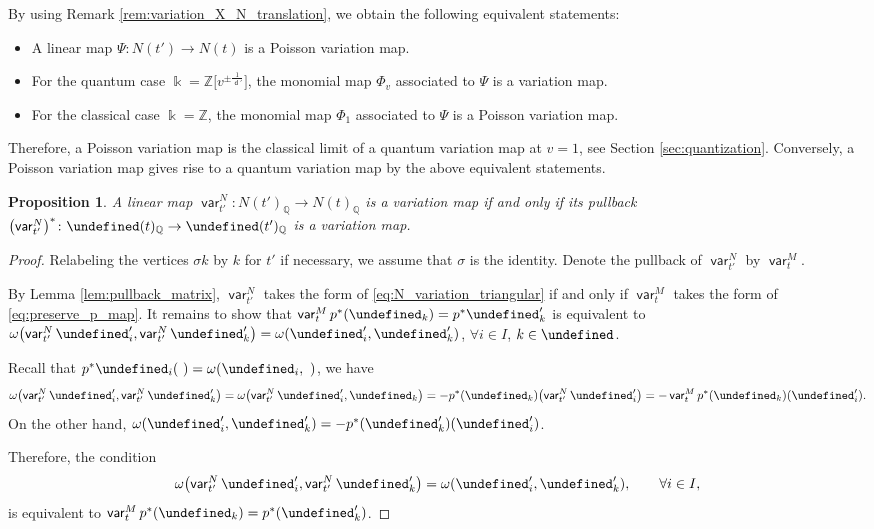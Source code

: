 \documentclass[10pt,a4paper]{amsart}
\newcommand{\kk}{\Bbbk}
\newcommand{\Z}{\mathbb{Z}}
\newcommand{\Q}{\mathbb{Q}}
\newcommand{\opname}[1]{\operatorname{\mathsf{#1}}}
\newcommand{\diag}{{\delta}}
\renewcommand{\diag}{{d}}
\newcommand{\var}{\opname{var}}
\newcommand{\ufv}{\opname{uf}}
\let\Mc\undefined
\let\Iufv\undefined
\let\ee\undefined
\newcommand{\Mc}{M^\circ}
\newcommand{\Iufv}{I_{\ufv}}
\renewcommand{\diag}{\opname{d}'}
\newcommand{\ee}{\mathbf{e}}
\numberwithin{equation}{section}
\newtheorem{Proposition}[Theorem]{Proposition}
 { \theoremstyle{definition}
\newtheorem{Definition}[Theorem]{Definition}
\newtheorem{Note}[Theorem]{Note}
\newtheorem{Example}[Theorem]{Example}
\newtheorem{Remark}[Theorem]{Remark}
\newtheorem{Assumption}[Theorem]{Assumption}
}
\begin{document}
\begin{Remark}\label{rem:X-Poisson_quantum_variation}
By using Remark \ref{rem:variation_X_N_translation}, we obtain the following equivalent statements:
\begin{itemize}\itemsep=0pt
 \item A linear map $\varPsi\colon N(t')\rightarrow N(t)$ is a Poisson variation map.
 \item For the quantum case $\kk=\Z\big[v^{\pm\frac{1}{\diag}}\big]$, the monomial map $\varPhi_v$ associated to $\varPsi$ is a variation map.
 \item For the classical case $\kk=\Z$, the monomial map $\varPhi_1$ associated to $\varPsi$ is a Poisson variation map.
\end{itemize}
Therefore, a Poisson variation map is the classical limit of a quantum variation map at $v=1$, see Section \ref{sec:quantization}. Conversely, a Poisson variation map gives rise to a quantum variation map by the above equivalent statements.
\end{Remark}

\begin{Proposition}\label{prop:linear_N_variation}
A linear map $\var_{t'}^{N}\colon N(t')_{\Q}\rightarrow N(t)_{\Q}$ is a
variation map if and only if its pullback $\bigl(\var_{t'}^{N}\bigr)^{*}\colon\Mc(t)_{\Q}\rightarrow\Mc(t')_{\Q}$
is a variation map.
\end{Proposition}

\begin{proof}
Relabeling the vertices $\sigma k$ by $k$ for $t'$ if necessary,
we assume that $\sigma$ is the identity. Denote the pullback of $\var_{t'}^{N}$
by $\var_{t}^{M}$.

By Lemma \ref{lem:pullback_matrix}, $\var_{t'}^{N}$ takes the form
of \eqref{eq:N_variation_triangular} if and only if $\var_{t}^{M}$
takes the form of \eqref{eq:preserve_p_map}. It remains
to show that $\var_{t}^{M}p^{*}(\ee_{k})=p^{*}\ee_{k}'$ is equivalent
to $\omega\bigl(\var_{t'}^{N}\ee'_{i},\var_{t'}^{N}\ee'_{k}\bigr)=\omega(\ee'_{i},\ee'_{k})$, $\forall i\in I$, $k\in\Iufv$.

Recall that $p^{*}\ee_{i}(\ )=\omega(\ee_{i},\ )$, we
have
\begin{align*}
\omega\bigl(\var_{t'}^{N}\ee'_{i},\var_{t'}^{N}\ee'_{k}\bigr) =\omega\bigl(\var_{t'}^{N}\ee'_{i},\ee_{k}\bigr) =-p^{*}(\ee_{k})\bigl(\var_{t'}^{N}\ee'_{i}\bigr) =-\var_{t}^{M}p^{*}(\ee_{k})(\ee_{i}').
\end{align*}
On the other hand, $\omega(\ee'_{i},\ee'_{k})=-p^{*}(\ee'_{k})(\ee'_{i})$.

Therefore, the condition \[\omega\bigl(\var_{t'}^{N}\ee'_{i},\var_{t'}^{N}\ee'_{k}\bigr)=\omega(\ee'_{i},\ee'_{k}),\qquad\forall i\in I,\]
 is equivalent to $\var_{t}^{M}p^{*}(\ee_{k})=p^{*}(\ee'_{k})$.
\end{proof}
\end{document}
